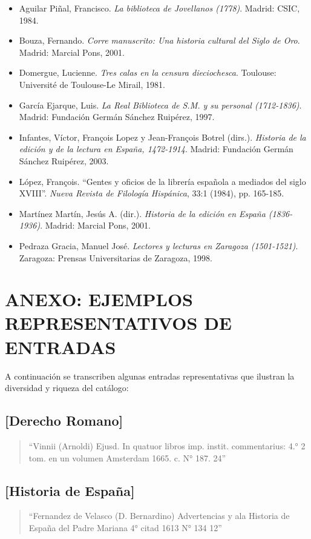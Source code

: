 \documentclass[12pt,a4paper]{article}
\begin{document}
\begin{itemize}
    \item Aguilar Piñal, Francisco. \textit{La biblioteca de Jovellanos (1778)}. Madrid: CSIC, 1984.
    \item Bouza, Fernando. \textit{Corre manuscrito: Una historia cultural del Siglo de Oro}. Madrid: Marcial Pons, 2001.
    \item Domergue, Lucienne. \textit{Tres calas en la censura dieciochesca}. Toulouse: Université de Toulouse-Le Mirail, 1981.
    \item García Ejarque, Luis. \textit{La Real Biblioteca de S.M. y su personal (1712-1836)}. Madrid: Fundación Germán Sánchez Ruipérez, 1997.
    \item Infantes, Víctor, François Lopez y Jean-François Botrel (dirs.). \textit{Historia de la edición y de la lectura en España, 1472-1914}. Madrid: Fundación Germán Sánchez Ruipérez, 2003.
    \item López, François. ``Gentes y oficios de la librería española a mediados del siglo XVIII''. \textit{Nueva Revista de Filología Hispánica}, 33:1 (1984), pp. 165-185.
    \item Martínez Martín, Jesús A. (dir.). \textit{Historia de la edición en España (1836-1936)}. Madrid: Marcial Pons, 2001.
    \item Pedraza Gracia, Manuel José. \textit{Lectores y lecturas en Zaragoza (1501-1521)}. Zaragoza: Prensas Universitarias de Zaragoza, 1998.
\end{itemize}

\section*{ANEXO: EJEMPLOS REPRESENTATIVOS DE ENTRADAS}

A continuación se transcriben algunas entradas representativas que ilustran la diversidad y riqueza del catálogo:

\subsection*{[Derecho Romano]}
\begin{quote}
``Vinnii (Arnoldi) Ejusd. In quatuor libros imp. instit. commentarius: 4.° 2 tom. en un volumen Amsterdam 1665. c. N° 187. 24''
\end{quote}

\subsection*{[Historia de España]}
\begin{quote}
``Fernandez de Velasco (D. Bernardino) Advertencias y ala Historia de España del Padre Mariana 4° citad 1613 N° 134 12''
\end{quote}
\end{document}
